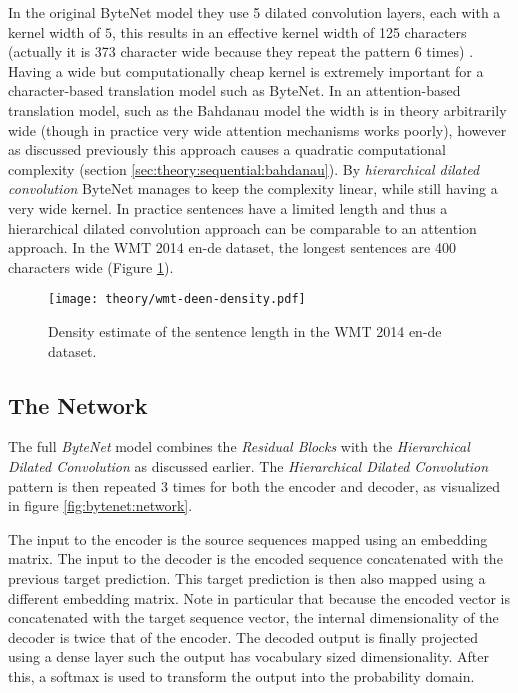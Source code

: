 In the original ByteNet model they use 5 dilated convolution layers, each with a kernel width of $5$, this results in an effective kernel width of 125 characters (actually it is 373 character wide because they repeat the pattern 6 times) . Having a wide but computationally cheap kernel is extremely important for a character-based translation model such as ByteNet. In an attention-based translation model, such as the Bahdanau model \cite{bahdanau-2015-nmt} the width is in theory arbitrarily wide (though in practice very wide attention mechanisms works poorly), however as discussed previously this approach causes a quadratic computational complexity (section \ref{sec:theory:sequential:bahdanau}). By \textit{hierarchical dilated convolution} ByteNet manages to keep the complexity linear, while still having a very wide kernel. In practice sentences have a limited length and thus a hierarchical dilated convolution approach can be comparable to an attention approach. In the WMT 2014 en-de dataset, the longest sentences are 400 characters wide (Figure \ref{fig:bytenet:wmt-deen-density}).

\begin{figure}[h]
    \centering
    \texttt{[image: theory/wmt-deen-density.pdf]}
    \caption{Density estimate of the sentence length in the WMT 2014 en-de dataset.}
    \label{fig:bytenet:wmt-deen-density}
\end{figure}

\subsection{The Network}

The full \textit{ByteNet} model combines the \textit{Residual Blocks} with the \textit{Hierarchical Dilated Convolution} as discussed earlier. The \textit{Hierarchical Dilated Convolution} pattern is then repeated 3 times for both the encoder and decoder, as visualized in figure \ref{fig:bytenet:network}.

The input to the encoder is the source sequences mapped using an embedding matrix. The input to the decoder is the encoded sequence concatenated with the previous target prediction. This target prediction is then also mapped using a different embedding matrix. Note in particular that because the encoded vector is concatenated with the target sequence vector, the internal dimensionality of the decoder is twice that of the encoder. The decoded output is finally projected using a dense layer such the output has vocabulary sized dimensionality. After this, a softmax is used to transform the output into the probability domain.

